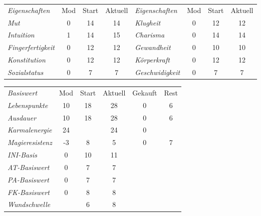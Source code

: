\documentclass{article}
\begin{document}
  \begin{table}[!h]
    \begin{tabularx}{\textwidth}{|X|cc|c|X|cc|c|}
      \hline
      \rowcolor{gray}\emph{Eigenschaften}& Mod& Start & Aktuell & \emph{Eigenschaften}& Mod& Start & Aktuell\\
      \rowcolor{white}\emph{Mut}& 0& 14& 14&
      \emph{Klugheit}& 0& 12& 12\\
      \rowcolor{white}\emph{Intuition}& 1& 14& 15&
      \emph{Charisma}& 0& 14& 14\\
      \rowcolor{white}\emph{Fingerfertigkeit}& 0& 12& 12&
      \emph{Gewandheit}& 0& 10& 10\\
      \rowcolor{white}\emph{Konstitution}& 0& 12& 12&
      \emph{Körperkraft}& 0& 12& 12\\
      \rowcolor{white}\emph{Sozialstatus}& 0& 7& 7&
      \emph{Geschwidigkeit}& 0& 7& 7\\	
      \hline
    \end{tabularx} 
    \vspace{1cm}
    \begin{tabularx}{0.65\textwidth}{|X|cc|c|cc|}
      \hline
      \rowcolor{gray}\emph{Basiswert}& Mod& Start& Aktuell& Gekauft& Rest\\
      \rowcolor{white}\emph{Lebenspunkte}& 10& 18& 28& 0& 6\\
      \rowcolor{white}\emph{Ausdauer}& 10& 18& 28& 0& 6\\
      \rowcolor{white}\emph{Karmalenergie}& 24& & 24& 0& \\
      \rowcolor{white}\emph{Magieresistenz}&-3&  8&  5& 0& 7\\
      \rowcolor{white}\emph{INI-Basis}& 0& 10& 11&  &  \\ 
      \rowcolor{white}\emph{AT-Basiswert}& 0&  7&  7&  &  \\
      \rowcolor{white}\emph{PA-Basiswert}& 0&  7&  7&  &  \\
      \rowcolor{white}\emph{FK-Basiswert}& 0&  8&  8&  &  \\
      \rowcolor{white}\emph{Wundschwelle}&  &  6&  8&  &  \\
      \hline
    \end{tabularx}
  \end{table}
\end{document}
